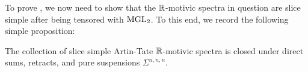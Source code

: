 To prove , we now need to show that the $\mathbb{R}$-motivic spectra in question are slice simple after being tensored with $\mathrm{MGL}_2$. To this end, we record the following simple proposition:
%
%
%
%
%
%
%
%
\begin{prop} \label{prop:sl-si-cond}
  The collection of slice simple Artin-Tate $\mathbb{R}$-motivic spectra is closed under direct sums, retracts, and pure suspensions $\Sigma^{n,n,n}$.
%
\end{prop}
